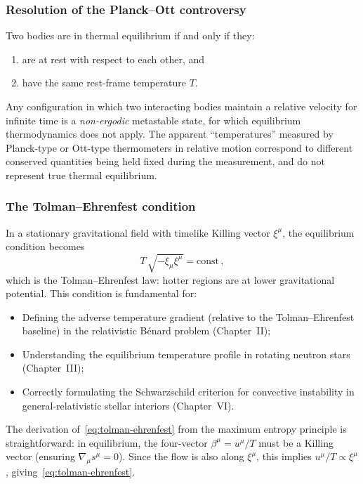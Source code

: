 \subsubsection{Resolution of the Planck--Ott controversy}
Two bodies are in thermal equilibrium if and only if they:
\begin{enumerate}
  \item[(a)] are at rest with respect to each other, and
  \item[(b)] have the same rest-frame temperature $T$.
\end{enumerate}
Any configuration in which two interacting bodies maintain a relative
velocity for infinite time is a \emph{non-ergodic} metastable state,
for which equilibrium thermodynamics does not apply.  The apparent
``temperatures'' measured by Planck-type or Ott-type thermometers in
relative motion correspond to different conserved quantities being held
fixed during the measurement, and do not represent true thermal equilibrium.

\subsubsection{The Tolman--Ehrenfest condition}
In a stationary gravitational field with timelike Killing vector
$\xi^\mu$, the equilibrium condition becomes
\begin{equation}
  T\,\sqrt{-\xi_\mu\xi^\mu} = \text{const}\,,
  \label{eq:tolman-ehrenfest}
\end{equation}
which is the Tolman--Ehrenfest law: hotter regions are at lower
gravitational potential.  This condition is fundamental for:
\begin{itemize}
  \item Defining the adverse temperature gradient (relative to the
    Tolman--Ehrenfest baseline) in the relativistic B\'enard problem
    (Chapter~II);
  \item Understanding the equilibrium temperature profile in rotating
    neutron stars (Chapter~III);
  \item Correctly formulating the Schwarzschild criterion for
    convective instability in general-relativistic stellar interiors
    (Chapter~VI).
\end{itemize}

The derivation of~\eqref{eq:tolman-ehrenfest} from the maximum entropy
principle is straightforward: in equilibrium, the four-vector
$\beta^\mu = u^\mu/T$ must be a Killing vector (ensuring
$\nabla_\mu s^\mu = 0$).  Since the flow is also along $\xi^\mu$,
this implies $u^\mu/T \propto \xi^\mu$, giving~\eqref{eq:tolman-ehrenfest}.

